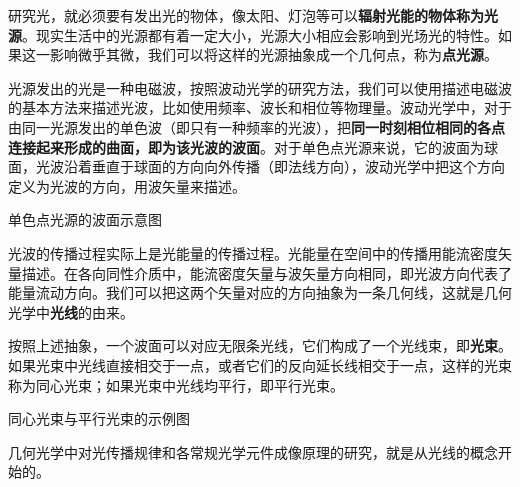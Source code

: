 
研究光，就必须要有发出光的物体，像太阳、灯泡等可以\textbf{辐射光能的物体称为光源}。现实生活中的光源都有着一定大小，光源大小相应会影响到光场光的特性。如果这一影响微乎其微，我们可以将这样的光源抽象成一个几何点，称为\textbf{点光源}。

光源发出的光是一种电磁波，按照波动光学的研究方法，我们可以使用描述电磁波的基本方法来描述光波，比如使用频率、波长和相位等物理量。波动光学中，对于由同一光源发出的单色波（即只有一种频率的光波），把\textbf{同一时刻相位相同的各点连接起来形成的曲面，即为该光波的波面}。对于单色点光源来说，它的波面为球面，光波沿着垂直于球面的方向向外传播（即法线方向），波动光学中把这个方向定义为光波的方向，用波矢量来描述。

\begin{issues}
\issueTODO 单色点光源的波面示意图
\end{issues}

光波的传播过程实际上是光能量的传播过程。光能量在空间中的传播用能流密度矢量描述。在各向同性介质中，能流密度矢量与波矢量方向相同，即光波方向代表了能量流动方向。我们可以把这两个矢量对应的方向抽象为一条几何线，这就是几何光学中\textbf{光线}的由来。

按照上述抽象，一个波面可以对应无限条光线，它们构成了一个光线束，即\textbf{光束}。如果光束中光线直接相交于一点，或者它们的反向延长线相交于一点，这样的光束称为同心光束；如果光束中光线均平行，即平行光束。

\begin{issues}
\issueTODO 同心光束与平行光束的示例图
\end{issues}

几何光学中对光传播规律和各常规光学元件成像原理的研究，就是从光线的概念开始的。
